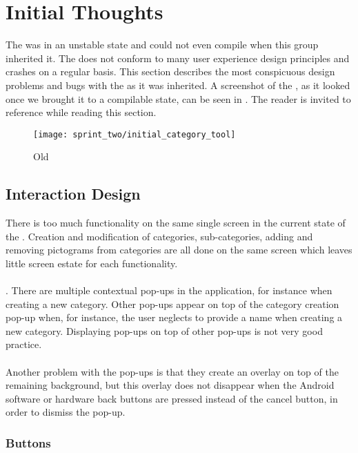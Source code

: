 \section{Initial Thoughts}

The \ct was in an unstable state and could not even compile when this group inherited it. The \ct does not conform to many user experience design principles and crashes on a regular basis. This section describes the most conspicuous design problems and  bugs with the \ct as it was inherited. A screenshot of the \ct, as it looked once we brought it to a compilable state, can be seen in . The reader is invited to reference  while reading this section.

\begin{figure}[!htbp]
    \centering
    \texttt{[image: sprint\_two/initial\_category\_tool]}
    \caption{Old \ct}
    \label{fig:category_tool_old}
\end{figure}

\subsection{Interaction Design}

There is too much functionality on the same single screen in the current state of the \ct. Creation and modification of categories, sub-categories, adding and removing pictograms from categories are all done on the same screen which leaves little screen estate for each functionality.
\\\\
.
There are multiple contextual pop-ups in the application, for instance when creating a new category. Other pop-ups appear on top of the category creation pop-up when, for instance, the user neglects to provide a name when creating a new category. Displaying pop-ups on top of other pop-ups is not very good practice.
\\\\
Another problem with the pop-ups is that they create an overlay on top of the remaining background, but this overlay does not disappear when the Android software or hardware back buttons are pressed instead of the cancel button, in order to dismiss the pop-up.

\subsubsection{Buttons}

